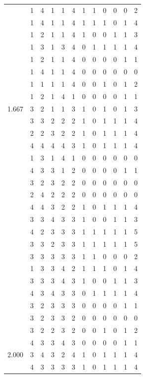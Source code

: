 \documentclass[]{book}
\theoremstyle{definition}
\theoremstyle{definition}
\theoremstyle{definition}
\theoremstyle{remark}
\begin{document}
\begin{table}
{\begin{tabular}[t]{rrrrrrrrrrrr}
 & 1 & 4 & 1 & 1 & 4 & 1 & 1 & 0 & 0 & 0 & 2\\
 & 1 & 4 & 1 & 1 & 4 & 1 & 1 & 1 & 0 & 1 & 4\\
 & 1 & 2 & 1 & 1 & 4 & 1 & 0 & 0 & 1 & 1 & 3\\
 & 1 & 3 & 1 & 3 & 4 & 0 & 1 & 1 & 1 & 1 & 4\\
 & 1 & 2 & 1 & 1 & 4 & 0 & 0 & 0 & 0 & 1 & 1\\
 & 1 & 4 & 1 & 1 & 4 & 0 & 0 & 0 & 0 & 0 & 0\\
 & 1 & 1 & 1 & 1 & 4 & 0 & 0 & 1 & 0 & 1 & 2\\
 & 1 & 2 & 1 & 4 & 1 & 0 & 0 & 0 & 0 & 1 & 1\\
1.667 & 3 & 2 & 1 & 1 & 3 & 1 & 0 & 1 & 0 & 1 & 3\\
 & 3 & 3 & 2 & 2 & 2 & 1 & 0 & 1 & 1 & 1 & 4\\
 & 2 & 2 & 3 & 2 & 2 & 1 & 0 & 1 & 1 & 1 & 4\\
 & 4 & 4 & 4 & 4 & 3 & 1 & 0 & 1 & 1 & 1 & 4\\
 & 1 & 3 & 1 & 4 & 1 & 0 & 0 & 0 & 0 & 0 & 0\\
 & 4 & 3 & 3 & 1 & 2 & 0 & 0 & 0 & 0 & 1 & 1\\
 & 3 & 2 & 3 & 2 & 2 & 0 & 0 & 0 & 0 & 0 & 0\\
 & 2 & 4 & 2 & 2 & 2 & 0 & 0 & 0 & 0 & 0 & 0\\
 & 4 & 4 & 3 & 2 & 2 & 1 & 0 & 1 & 1 & 1 & 4\\
 & 3 & 3 & 4 & 3 & 3 & 1 & 0 & 0 & 1 & 1 & 3\\
 & 4 & 2 & 3 & 3 & 3 & 1 & 1 & 1 & 1 & 1 & 5\\
 & 3 & 3 & 2 & 3 & 3 & 1 & 1 & 1 & 1 & 1 & 5\\
 & 3 & 3 & 3 & 3 & 3 & 1 & 1 & 0 & 0 & 0 & 2\\
 & 1 & 3 & 3 & 4 & 2 & 1 & 1 & 1 & 0 & 1 & 4\\
 & 3 & 3 & 3 & 4 & 3 & 1 & 0 & 0 & 1 & 1 & 3\\
 & 4 & 3 & 4 & 3 & 3 & 0 & 1 & 1 & 1 & 1 & 4\\
 & 3 & 2 & 3 & 3 & 3 & 0 & 0 & 0 & 0 & 1 & 1\\
 & 3 & 2 & 3 & 3 & 2 & 0 & 0 & 0 & 0 & 0 & 0\\
 & 3 & 2 & 2 & 3 & 2 & 0 & 0 & 1 & 0 & 1 & 2\\
 & 4 & 3 & 3 & 4 & 3 & 0 & 0 & 0 & 0 & 1 & 1\\
2.000 & 3 & 4 & 3 & 2 & 4 & 1 & 0 & 1 & 1 & 1 & 4\\
 & 4 & 3 & 3 & 3 & 3 & 1 & 0 & 1 & 1 & 1 & 4\\

\end{tabular}}
\end{table}
\end{document}

